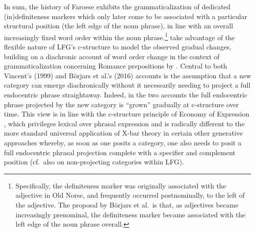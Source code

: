 \documentclass[output=paper,hidelinks]{langscibook}
\begin{document}
In sum, the history of Faroese exhibits the grammaticalization of dedicated (in)definiteness markers which only later come to be associated with a particular structural position (the left edge of the noun phrase), in line with an overall increasingly fixed word order within the noun phrase.\footnote{Specifically, the definiteness marker was originally associated with the adjective in Old Norse, and frequently occurred postnominally, to the left of the adjective. The proposal by B{\"o}rjars et al.~is that, as adjectives became increasingly prenominal, the definiteness marker became associated with the left edge of the noun phrase overall.} \citet{Borjarsetal16} take advantage of the flexible nature of LFG's c-structure to model the observed gradual changes, %
building on a diachronic account of word order change in the context of grammaticalization concerning Romance prepositions by \citet{vincent1999evolution}.
Central to both Vincent's (1999) and B{\"o}rjars et al.'s (2016) accounts is  the assumption that a new category can emerge diachronically without it necessarily needing to project a full endocentric phrase straightaway.  Indeed, in the two accounts the full endocentric phrase projected by the new category is ``grown'' gradually at c-structure over time. This view is in line with the c-structure principle of Economy of Expression \citep{BresnanEtAl2016}, which privileges lexical over phrasal expression and is radically different to the more standard universal application of X-bar theory in certain other generative approaches whereby, as soon as one posits a category, one also needs to posit a full endocentric phrasal projection complete with a specifier and complement position (cf.~also \citealp{Toivonen2001,Toivonen2007} on non-projecting categories within LFG). %
\end{document}
